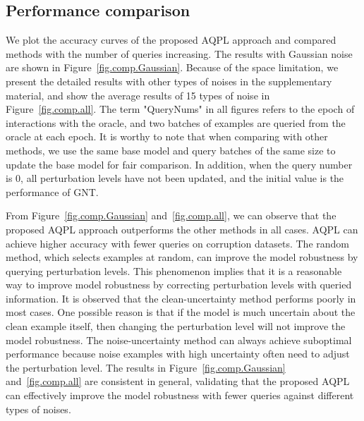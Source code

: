 \documentclass[letterpaper]{article} %
\begin{document}
\subsection{Performance comparison}
We plot the accuracy curves of the proposed AQPL approach and compared methods with the number of queries increasing. The results with Gaussian noise are shown in Figure~\ref{fig.comp.Gaussian}. Because of the space limitation, we present the detailed results with other types of noises in the supplementary material, and show the average results of 15 types of noise in Figure~\ref{fig.comp.all}. The term "QueryNums" in all figures refers to the epoch of interactions with the oracle, and two batches of examples are queried from the oracle at each epoch. It is worthy to note that when comparing with other methods, we use the same base model and query batches of the same size to update the base model for fair comparison. In addition, when the query number is $0$, all perturbation levels have not been updated, and the initial value is the performance of GNT.

From Figure~\ref{fig.comp.Gaussian} and~\ref{fig.comp.all}, we can observe that the proposed AQPL approach outperforms the other methods in all cases. AQPL can achieve higher accuracy with fewer queries on corruption datasets. The random method, which selects examples at random, can improve the model robustness by querying perturbation levels. This phenomenon implies that it is a reasonable way to improve model robustness by correcting perturbation levels with queried information. It is observed that the clean-uncertainty method performs poorly in most cases. One possible reason is that if the model is much uncertain about the clean example itself, then changing the perturbation level will not improve the model robustness. The noise-uncertainty method can always achieve suboptimal performance because noise examples with high uncertainty often need to adjust the perturbation level. The results in Figure~\ref{fig.comp.Gaussian} and~\ref{fig.comp.all} are consistent in general, validating that the proposed  AQPL can effectively improve the model robustness with fewer queries against different types of noises.
\end{document}
